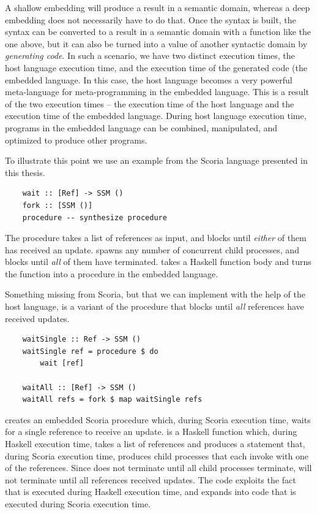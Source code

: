 A shallow embedding will produce a result in a semantic domain, whereas a deep embedding does not necessarily have to
do that. Once the syntax is built, the syntax can be converted to a result in a semantic domain with a  function
like the one above, but it can also be turned into a value of another syntactic domain by \textit{generating code}. In such
a scenario, we have two distinct execution times, the host language execution time, and the execution time of the generated
code (the embedded language. In this case, the host language becomes a very powerful meta-language for meta-programming in
the embedded language. This is a result of the two execution times -- the execution time of the host language and the
execution time of the embedded language. During host language execution time, programs in the embedded language can be
combined, manipulated, and optimized to produce other programs.

To illustrate this point we use an example from the Scoria language presented in this thesis.

\begin{verbatim}
    wait :: [Ref] -> SSM ()
    fork :: [SSM ()]
    procedure -- synthesize procedure
\end{verbatim}

The  procedure takes a list of references as input, and blocks until \textit{either} of them has received an update.
 spawns any number of concurrent child processes, and blocks until \textit{all} of them have terminated.
 takes a Haskell function body and turns the function into a procedure in the embedded language.

Something missing from Scoria, but that we can implement with the help of the host language, is a variant of the
 procedure that blocks until \textit{all} references have received updates.

\begin{verbatim}
    waitSingle :: Ref -> SSM ()
    waitSingle ref = procedure $ do
        wait [ref]
    
    waitAll :: [Ref] -> SSM ()
    waitAll refs = fork $ map waitSingle refs
\end{verbatim}

 creates an embedded Scoria procedure which, during Scoria execution time, waits for a
single reference to receive an update.  is a Haskell function which, during Haskell execution time, takes a list of
references and produces a  statement that, during Scoria execution time, produces child processes that each
invoke  with one of the references. Since  does not terminate until all child processes
terminate,  will not terminate until all references received updates. The code exploits the fact that
 is executed during Haskell execution time, and expands into code that is executed during Scoria execution time.

